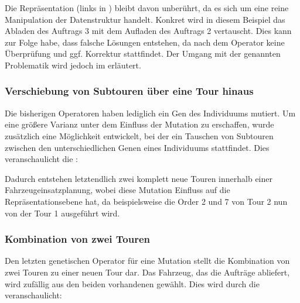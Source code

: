 
Die Repräsentation (links in ) bleibt davon unberührt, da es sich um eine reine Manipulation der Datenstruktur handelt. Konkret wird in diesem Beispiel das Abladen des Auftrags 3 mit dem Aufladen des Auftrags 2 vertauscht. Dies kann zur Folge habe, dass falsche Lösungen entstehen, da nach dem Operator keine Überprüfung und ggf. Korrektur stattfindet. Der Umgang mit der genannten Problematik wird jedoch im  erläutert. 

\subsubsection{Verschiebung von Subtouren über eine Tour hinaus}
Die bisherigen Operatoren haben lediglich ein Gen des Individuums mutiert. Um eine größere Varianz unter dem Einfluss der Mutation zu erschaffen, wurde zusätzlich eine Möglichkeit entwickelt, bei der ein Tauschen von Subtouren zwischen den unterschiedlichen Genen eines Individuums stattfindet. Dies veranschaulicht die :


Dadurch entstehen letztendlich zwei komplett neue Touren innerhalb einer Fahrzeugeinsatzplanung, wobei diese Mutation Einfluss auf die Repräsentationsebene hat, da beispielsweise die Order 2 und 7 von Tour 2 nun von der Tour 1 ausgeführt wird. 

\subsubsection{Kombination von zwei Touren}
Den letzten genetischen Operator für eine Mutation stellt die Kombination von zwei Touren zu einer neuen Tour dar. Das Fahrzeug, das die Aufträge abliefert, wird zufällig aus den beiden vorhandenen gewählt. Dies wird durch die  veranschaulicht:


\FloatBarrier
~\newpage
